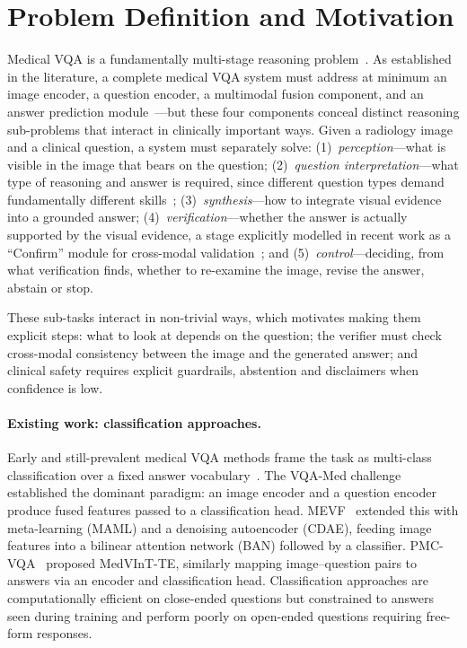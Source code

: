 \documentclass{article}
\begin{document}
\section{Problem Definition and Motivation}
Medical VQA is a fundamentally multi-stage reasoning problem~\cite{lin2023survey}. As established in the literature,
a complete medical VQA system must address at minimum an image encoder, a question encoder, a multimodal fusion
component, and an answer prediction module~\cite{lin2023survey}---but these four components conceal distinct
reasoning sub-problems that interact in clinically important ways. Given a radiology image and a clinical question,
a system must separately solve: (1)~\emph{perception}---what is visible in the image that bears on the question;
(2)~\emph{question interpretation}---what type of reasoning and answer is required, since different question types
demand fundamentally different skills~\cite{liu2023q2a,liu2023conditional}; (3)~\emph{synthesis}---how to integrate
visual evidence into a grounded answer; (4)~\emph{verification}---whether the answer is actually supported by the
visual evidence, a stage explicitly modelled in recent work as a ``Confirm'' module for cross-modal
validation~\cite{syed2025medvctp}; and (5)~\emph{control}---deciding, from what verification finds, whether to
re-examine the image, revise the answer, abstain or stop.

These sub-tasks interact in non-trivial ways, which motivates making them explicit steps: what to look at depends
on the question; the verifier must check cross-modal consistency between the image and the generated answer; and
clinical safety requires explicit guardrails, abstention and disclaimers when confidence is low.

\paragraph{Existing work: classification approaches.} Early and still-prevalent medical VQA methods frame the task as
multi-class classification over a fixed answer vocabulary~\cite{lin2023survey}. The VQA-Med
challenge~\cite{benabacha2019vqamed} established the dominant paradigm: an image encoder and a question encoder
produce fused features passed to a classification head. MEVF~\cite{nguyen2019mevf} extended this with meta-learning
(MAML) and a denoising autoencoder (CDAE), feeding image features into a bilinear attention network (BAN) followed by
a classifier. PMC-VQA~\cite{zhang2023pmcvqa} proposed MedVInT-TE, similarly mapping image--question pairs to answers
via an encoder and classification head. Classification approaches are computationally efficient on close-ended
questions but constrained to answers seen during training and perform poorly on open-ended questions requiring
free-form responses.
\end{document}
